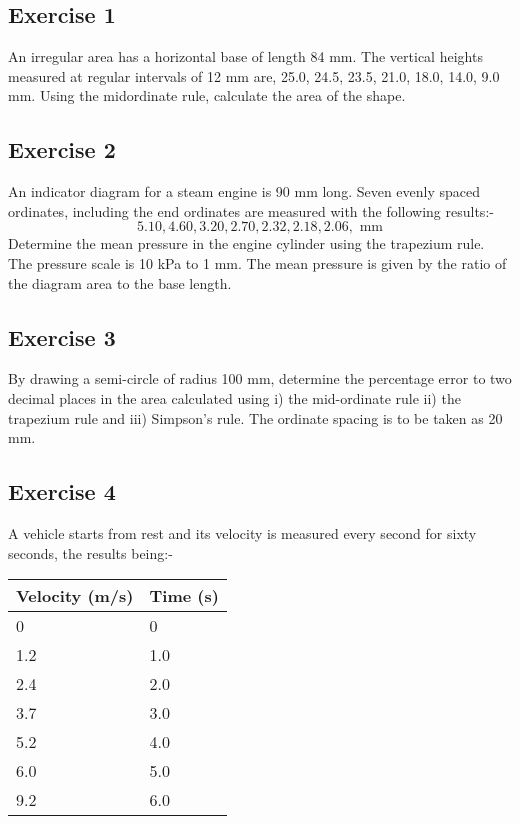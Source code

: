 \documentclass[
  english,
  11pt,
  oneside]{book}
\newcommand{\slide}{}
\theoremstyle{definition}
\theoremstyle{definition}
\theoremstyle{definition}
\theoremstyle{definition}
\theoremstyle{remark}
\begin{document}
\slide

\subsection*{Exercise 1}\label{exercise-1-7}

An irregular area has a horizontal base of length 84 mm. The vertical heights measured at regular intervals of 12 mm are, 25.0, 24.5, 23.5, 21.0, 18.0, 14.0, 9.0 mm. Using the midordinate rule, calculate the area of the shape.

\slide

\subsection*{Exercise 2}\label{exercise-2-7}

An indicator diagram for a steam engine is 90 mm long. Seven evenly spaced ordinates, including the end ordinates are measured with the following results:-
\[
5.10, 4.60, 3.20, 2.70, 2.32, 2.18, 2.06, \text{ mm}
\]
Determine the mean pressure in the engine cylinder using the trapezium rule. The pressure scale is 10 kPa to 1 mm. The mean pressure is given by the ratio of the diagram area to the base length.

\slide

\subsection*{Exercise 3}\label{exercise-3-5}

By drawing a semi-circle of radius 100 mm, determine the percentage error to two decimal places in the area calculated using i) the mid-ordinate rule ii) the trapezium rule and iii) Simpson's rule. The ordinate spacing is to be taken as 20 mm.

\slide

\subsection*{Exercise 4}\label{exercise-4-4}

A vehicle starts from rest and its velocity is measured every second for sixty seconds, the results being:-

\begin{tabular}{l|l}
\hline
Velocity (m/s) & Time (s)\\
\hline
0 & 0\\
\hline
1.2 & 1.0\\
\hline
2.4 & 2.0\\
\hline
3.7 & 3.0\\
\hline
5.2 & 4.0\\
\hline
6.0 & 5.0\\
\hline
9.2 & 6.0\\
\hline
\end{tabular}
\end{document}
